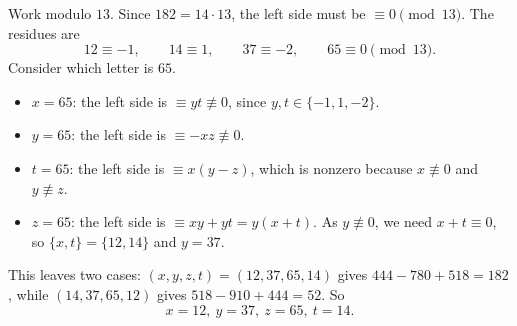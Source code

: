 Work modulo $13$. Since $182=14\cdot13$, the left side must be $\equiv0\pmod{13}$. The residues are
\[12\equiv-1,\qquad14\equiv1,\qquad37\equiv-2,\qquad65\equiv0\pmod{13}.\]
Consider which letter is $65$.
\begin{itemize}
\item $x=65$: the left side is $\equiv yt\not\equiv0$, since $y,t\in\{-1,1,-2\}$.
\item $y=65$: the left side is $\equiv-xz\not\equiv0$.
\item $t=65$: the left side is $\equiv x(y-z)$, which is nonzero because $x\not\equiv0$ and $y\not\equiv z$.
\item $z=65$: the left side is $\equiv xy+yt=y(x+t)$. As $y\not\equiv0$, we need $x+t\equiv0$, so $\{x,t\}=\{12,14\}$ and $y=37$.
\end{itemize}
This leaves two cases: $(x,y,z,t)=(12,37,65,14)$ gives $444-780+518=182$, while $(14,37,65,12)$ gives $518-910+444=52$. So
\[\boxed{x=12,\ y=37,\ z=65,\ t=14}.\]
